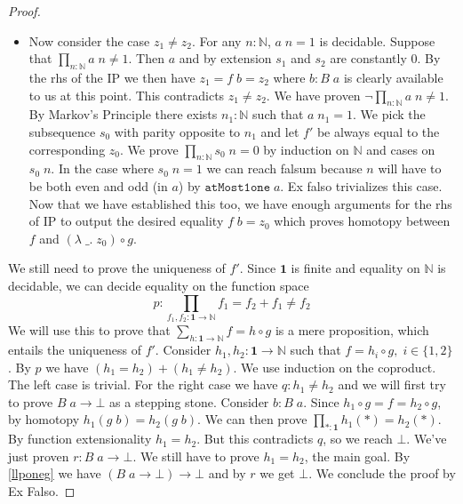 \documentclass[12pt]{article}
\begin{document}
\begin{proof}
\begin{itemize}
\item Now consider the case $z_1 \neq z_2$. 
For any $n : \mathbb{N}$, $a\; n = 1$ is decidable. 
Suppose that $\prod_{n : 
\mathbb{N}} a\; n \neq 1$. 
Then $a$ and by extension $s_1$ and $s_2$ are constantly $0$. 
By the rhs of the IP we then have $z_1 = f\; b = z_2$ where $b : B\; a$ is clearly available to us at this point. 
This contradicts $z_1 \neq z_2$. 
We have proven $\neg \prod_{n : 
\mathbb{N}} a\; n \neq 1$. 
By Markov's Principle there exists $n_1 : \mathbb{N}$ such that $a\; n_1 = 1$. 
We pick the subsequence $s_0$ with parity opposite to $n_1$ and let $f'$ be always equal to the corresponding $z_0$. 
We prove $\prod_{n : \mathbb{N}} s_0\; n = 0$ by induction on $\mathbb{N}$ and cases on $s_0 \;n$. 
In the case where $s_0\; n = 1$ we can reach falsum because $n$ will have to be both even and odd (in $a$) by $\mathtt{atMost1one} \; a$. Ex falso trivializes this case. 
Now that we have established this too, we have enough arguments for the rhs of IP to output the desired equality $f\; b = z_0$ which proves homotopy between $f$ and $(\lambda\;\_.\; z_0) \circ g$.
\end{itemize}
We still need to prove the uniqueness of $f'$. 
Since $\mathbf{1}$ is finite and equality on $\mathbb{N}$ is decidable, we can decide equality on the function space 
$$p : \prod_{f_1,f_2 : \mathbf{1}\rightarrow \mathbb{N}} f_1 = f_2 + f_1 \neq f_2$$
We will use this to prove that $\sum_{h : \mathbf{1}\rightarrow \mathbb{N}} f= h \circ g$ is a mere proposition, which entails the uniqueness of $f'$. 
Consider $h_1,h_2 : \mathbf{1}\rightarrow \mathbb{N}$ such that $f= h_i \circ g,\; i \in \{1,2\}$. 
By $p$ we have $(h_1 = h_2) + (h_1 \neq h_2)$. 
We use induction on the coproduct. 
The left case is trivial. 
For the right case we have $q : h_1 \neq h_2$ and we will first try to prove $B\; a \rightarrow \bot$ as a stepping stone. 
Consider $b : B\; a$. 
Since $h_1 \circ g = f = h_2 \circ g$, by homotopy $h_1 (g\; b) = h_2 (g\; b)$. 
We can then prove $\prod_{*: \mathbf{1}} h_1 (*) = h_2 (*)$. 
By function extensionality $h_1 = h_2$. 
But this contradicts $q$, so we reach $\bot$. 
We've just proven $r : B\;a \rightarrow \bot$. 
We still have to prove $h_1 = h_2$, the main goal. 
By \cref{llponeg} we have $(B\; a \rightarrow \bot) \rightarrow \bot$ and by $r$ we get $\bot$. 
We conclude the proof by Ex Falso.
\end{proof}
\end{document}
